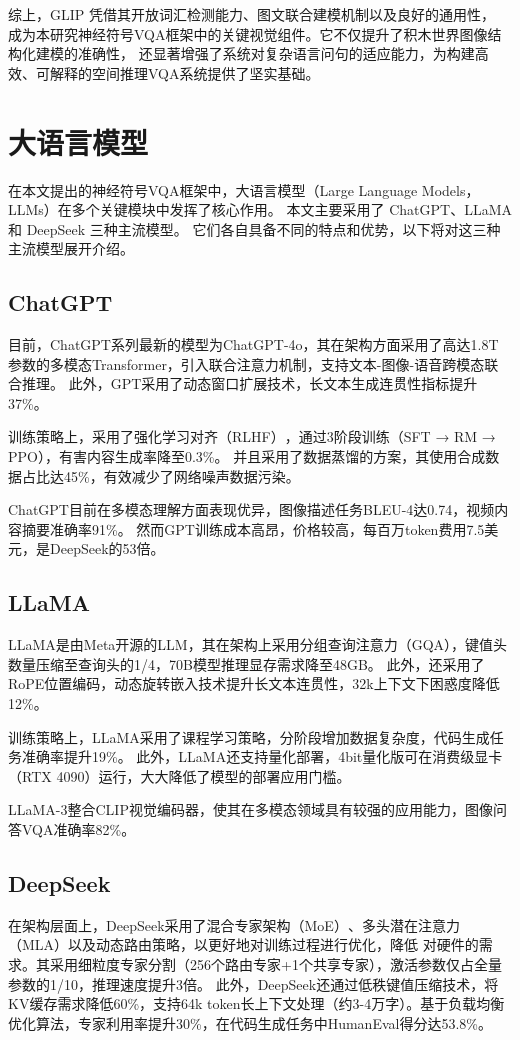 综上，GLIP 凭借其开放词汇检测能力、图文联合建模机制以及良好的通用性，
成为本研究神经符号VQA框架中的关键视觉组件。它不仅提升了积木世界图像结构化建模的准确性，
还显著增强了系统对复杂语言问句的适应能力，为构建高效、可解释的空间推理VQA系统提供了坚实基础。
\section{大语言模型}
在本文提出的神经符号VQA框架中，大语言模型（Large Language Models， LLMs）在多个关键模块中发挥了核心作用。
本文主要采用了 ChatGPT、LLaMA 和 DeepSeek 三种主流模型。
它们各自具备不同的特点和优势，以下将对这三种主流模型展开介绍。
\subsection{ChatGPT}
目前，ChatGPT系列最新的模型为ChatGPT-4o，其在架构方面采用了高达1.8T参数的多模态Transformer，引入联合注意力机制，支持文本-图像-语音跨模态联合推理。
此外，GPT采用了动态窗口扩展技术，长文本生成连贯性指标提升37\%。

训练策略上，采用了强化学习对齐（RLHF）​，通过3阶段训练（SFT → RM → PPO），有害内容生成率降至0.3\%。
并且采用了​数据蒸馏的方案，其使用合成数据占比达45\%，有效减少了网络噪声数据污染。

ChatGPT目前在​多模态理解方面表现优异，图像描述任务BLEU-4达0.74，视频内容摘要准确率91\%。
然而GPT训练成本高昂，价格较高，每百万token费用7.5美元，是DeepSeek的53倍。
\subsection{LLaMA}
LLaMA是由Meta开源的LLM，其在架构上采用分组查询注意力（GQA），​键值头数量压缩至查询头的1/4，70B模型推理显存需求降至48GB。
此外，还采用了RoPE位置编码，动态旋转嵌入技术提升长文本连贯性，32k上下文下困惑度降低12\%。

训练策略上，LLaMA采用了课程学习策略，分阶段增加数据复杂度，代码生成任务准确率提升19\%。
此外，LLaMA还支持量化部署，4bit量化版可在消费级显卡（RTX 4090）运行，大大降低了模型的部署应用门槛。

LLaMA-3整合CLIP视觉编码器，使其在多模态领域具有较强的应用能力，图像问答VQA准确率82\%。
\subsection{DeepSeek}
在架构层面上，DeepSeek采用了混合专家架构（MoE）​、多头潜在注意力（MLA）以及动态路由策略，以更好地对训练过程进行优化，降低
对硬件的需求。其采用细粒度专家分割（256个路由专家+1个共享专家），激活参数仅占全量参数的1/10，推理速度提升3倍。
此外，DeepSeek还通过低秩键值压缩技术，将KV缓存需求降低60\%，支持64k token长上下文处理（约3-4万字）。基于负载均衡优化算法，专家利用率提升30\%，在代码生成任务中HumanEval得分达53.8\%。

